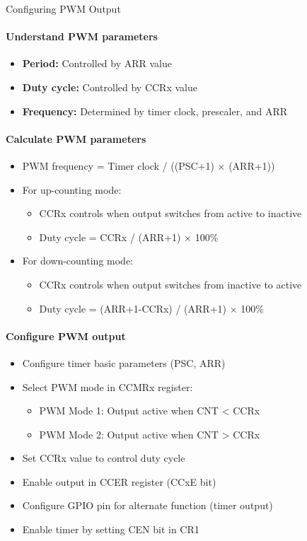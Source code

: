 \begin{KR}{Configuring PWM Output}
\paragraph{Understand PWM parameters}
\begin{itemize}
    \item \textbf{Period:} Controlled by ARR value
    \item \textbf{Duty cycle:} Controlled by CCRx value
    \item \textbf{Frequency:} Determined by timer clock, prescaler, and ARR
\end{itemize}

\paragraph{Calculate PWM parameters}
\begin{itemize}
    \item PWM frequency = Timer clock / ((PSC+1) × (ARR+1))
    \item For up-counting mode:
    \begin{itemize}
        \item CCRx controls when output switches from active to inactive
        \item Duty cycle = CCRx / (ARR+1) × 100\%
    \end{itemize}
    \item For down-counting mode:
    \begin{itemize}
        \item CCRx controls when output switches from inactive to active
        \item Duty cycle = (ARR+1-CCRx) / (ARR+1) × 100\%
    \end{itemize}
\end{itemize}

\paragraph{Configure PWM output}
\begin{itemize}
    \item Configure timer basic parameters (PSC, ARR)
    \item Select PWM mode in CCMRx register:
    \begin{itemize}
        \item PWM Mode 1: Output active when CNT < CCRx
        \item PWM Mode 2: Output active when CNT > CCRx
    \end{itemize}
    \item Set CCRx value to control duty cycle
    \item Enable output in CCER register (CCxE bit)
    \item Configure GPIO pin for alternate function (timer output)
    \item Enable timer by setting CEN bit in CR1
\end{itemize}
\end{KR}

